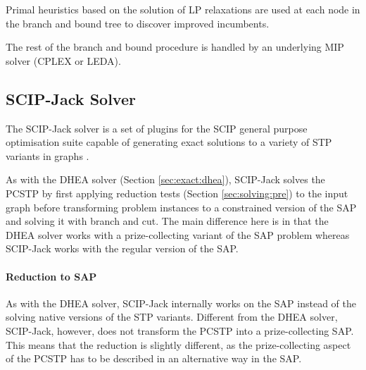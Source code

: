 Primal heuristics based on the solution of LP relaxations are used at each node in the branch and bound
tree to discover improved incumbents.

The rest of the branch and bound procedure is handled by an underlying MIP solver (CPLEX or LEDA).
\subsection{SCIP-Jack Solver}
\label{sec:exact:scipj}
The SCIP-Jack solver is a set of plugins for the SCIP general purpose optimisation suite capable
of generating exact solutions to a variety of STP variants in graphs \cite{gamrath2017scip}.

As with the DHEA solver (Section \ref{sec:exact:dhea}), SCIP-Jack solves the PCSTP by first applying
reduction tests (Section \ref{sec:solving:pre}) to the input graph before transforming problem
instances to a constrained version of the SAP and solving it with branch and cut.
The main difference here is in that the DHEA solver works with a prize-collecting variant
 of the SAP problem whereas SCIP-Jack works with the regular version of the SAP.

\paragraph{Reduction to SAP}
As with the DHEA solver, SCIP-Jack internally works on the SAP instead of the solving native
versions of the STP variants. Different from the DHEA solver, SCIP-Jack, however, does not
transform the PCSTP into a prize-collecting SAP. This means that the reduction is slightly
different, as the prize-collecting aspect of the PCSTP has to be described in an alternative
way in the SAP.

